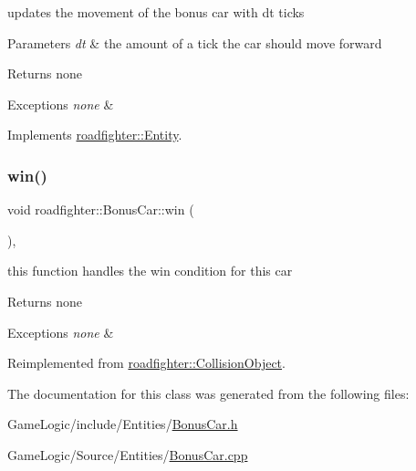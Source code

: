 updates the movement of the bonus car with dt ticks 
\begin{DoxyParams}{Parameters}
{\em dt} & the amount of a tick the car should move forward \\
\hline
\end{DoxyParams}
\begin{DoxyReturn}{Returns}
none 
\end{DoxyReturn}

\begin{DoxyExceptions}{Exceptions}
{\em none} & \\
\hline
\end{DoxyExceptions}


Implements \hyperlink{classroadfighter_1_1Entity_a66614a11004d6f9516473f60b530f689}{roadfighter\+::\+Entity}.

\mbox{\label{classroadfighter_1_1BonusCar_afb2d142de799694db896ba875d7d0c27}} 
\subsubsection{\texorpdfstring{win()}{win()}}
{\footnotesize\ttfamily void roadfighter\+::\+Bonus\+Car\+::win (\begin{DoxyParamCaption}{ }\end{DoxyParamCaption})\hspace{0.3cm}{\ttfamily [override]}, {\ttfamily [virtual]}}

this function handles the win condition for this car \begin{DoxyReturn}{Returns}
none 
\end{DoxyReturn}

\begin{DoxyExceptions}{Exceptions}
{\em none} & \\
\hline
\end{DoxyExceptions}


Reimplemented from \hyperlink{classroadfighter_1_1CollisionObject_aa793e1b9943ee90bbb4129ddd06b9be7}{roadfighter\+::\+Collision\+Object}.



The documentation for this class was generated from the following files\+:\begin{DoxyCompactItemize}
\item 
Game\+Logic/include/\+Entities/\hyperlink{BonusCar_8h}{Bonus\+Car.\+h}\item 
Game\+Logic/\+Source/\+Entities/\hyperlink{BonusCar_8cpp}{Bonus\+Car.\+cpp}\end{DoxyCompactItemize}
